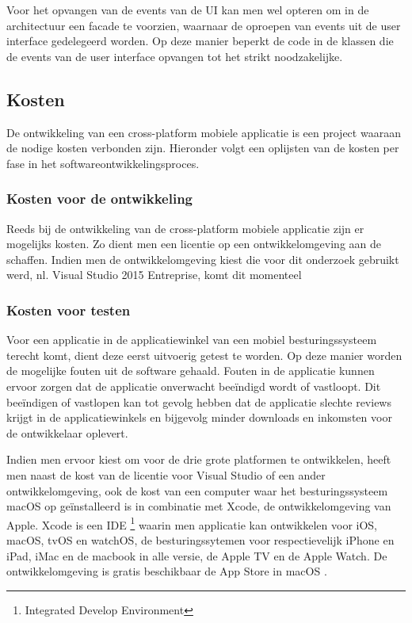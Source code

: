 Voor het opvangen van de events van de UI kan men wel opteren om in de architectuur een facade te voorzien, waarnaar de oproepen van events uit de user interface gedelegeerd worden.
Op deze manier beperkt de code in de klassen die de events van de user interface opvangen tot het strikt noodzakelijke.
\label{sec:appkosten}
\subsection{Kosten}
De ontwikkeling van een cross-platform mobiele applicatie is een project waaraan de nodige kosten verbonden zijn.
Hieronder volgt een oplijsten van de kosten per fase in het softwareontwikkelingsproces.

\subsubsection{Kosten voor de ontwikkeling}
Reeds bij de ontwikkeling van de cross-platform mobiele applicatie zijn er mogelijks kosten. Zo dient men een licentie op een ontwikkelomgeving
aan de schaffen. Indien men de ontwikkelomgeving kiest die voor dit onderzoek gebruikt werd, nl. Visual Studio 2015 Entreprise, komt dit momenteel

\subsubsection{Kosten voor testen}
Voor een applicatie in de applicatiewinkel van een mobiel besturingssysteem terecht komt, dient deze eerst uitvoerig getest te
worden. Op deze manier worden de mogelijke fouten uit de software gehaald. Fouten in de applicatie kunnen ervoor zorgen dat de applicatie
onverwacht beeïndigd wordt of vastloopt.
Dit beeïndigen of vastlopen kan tot gevolg hebben dat de applicatie slechte reviews krijgt in de applicatiewinkels en bijgevolg minder downloads en inkomsten voor de ontwikkelaar oplevert.

Indien men ervoor kiest om voor de drie grote platformen te ontwikkelen, heeft men naast de kost van de licentie voor Visual Studio of een ander ontwikkelomgeving,
ook de kost van een computer waar het besturingssysteem macOS op geïnstalleerd is in combinatie met Xcode, de ontwikkelomgeving van Apple.
Xcode is een IDE \footnote{Integrated Develop Environment} waarin men applicatie kan ontwikkelen voor iOS, macOS, tvOS en watchOS, de besturingssytemen voor respectievelijk iPhone en iPad,
iMac en de macbook in alle versie, de Apple TV en de Apple Watch. De ontwikkelomgeving is gratis beschikbaar de App Store in macOS \citep{xcodemacappstore2017}.

